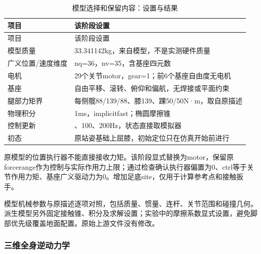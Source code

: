 \FloatBarrier\begingroup\small\setlength{\tabcolsep}{2.5pt}
\begin{longtable}[]{@{}
  >{\raggedright\arraybackslash}p{}
  >{\raggedright\arraybackslash}p{}@{}}
\caption{模型选择和保留内容：设置与结果}\label{tab:s25-1}\tabularnewline
\toprule\noalign{}
\begin{minipage}[b]{\linewidth}\raggedright
项目
\end{minipage} & \begin{minipage}[b]{\linewidth}\raggedright
该阶段设置
\end{minipage} \\
\midrule\noalign{}
\endfirsthead
\toprule\noalign{}
\begin{minipage}[b]{\linewidth}\raggedright
项目
\end{minipage} & \begin{minipage}[b]{\linewidth}\raggedright
该阶段设置
\end{minipage} \\
\midrule\noalign{}
\endhead
\bottomrule\noalign{}
\endlastfoot
模型质量 & 33.341142kg，来自模型，不是实测硬件质量 \\
广义位置/速度维度 & nq=36，nv=35，含基座四元数 \\
电机 & 29个关节motor，gear=1；前6个基座自由度无电机 \\
基座 & 自由平移、滚转、俯仰和偏航，无焊接或平面约束 \\
腿部力矩界 & 每侧髋88/139/88、膝139、踝50/50N·m，取自原描述 \\
物理积分 & 1ms，implicitfast；椭圆摩擦锥 \\
控制更新 & 50、100、200Hz，状态直接取模拟器 \\
初态 & 原站姿基础上屈膝，初始定位只在仿真开始前进行 \\
\end{longtable}\endgroup

原模型的位置执行器不能直接接收力矩。该阶段显式替换为motor，保留原forcerange作为控制与实际作用力上限；通过检查确认执行器偏置为0、ctrl等于关节作用力矩、基座广义驱动力为0。增加足底site，仅用于计算参考点和接触扳手。

模型机械参数与原描述逐项对照，包括质量、惯量、连杆、关节范围和碰撞几何。派生模型另外固定接触锥、积分及求解设置；实验中的摩擦系数显式设置，避免脚部优先级覆盖地面配置。原始上游文件没有修改。

\subsubsection{三维全身逆动力学}\label{s25-detail-3}

